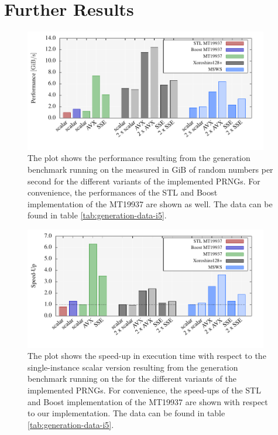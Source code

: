 \documentclass{stdlocal}
\begin{document}
\section{Further Results} %
\label{sec:further_results}
  \begin{figure}[H]
    \center
    \includegraphics[width=0.95\textwidth]{plots/generation_laptop.pdf}
    \caption[Generation Benchmark Performance for ]{%
      The plot shows the performance resulting from the generation benchmark running on the  measured in $\mathrm{GiB}$ of random numbers per second for the different variants of the implemented PRNGs.
      For convenience, the performances of the STL and Boost implementation of the MT19937 are shown as well.
      The data can be found in table \ref{tab:generation-data-i5}.
    }
    \label{fig:generation-performance-i5}
  \end{figure}

  \begin{figure}[H]
    \center
    \includegraphics[width=0.95\textwidth]{plots/generation_laptop_speedup.pdf}
    \caption[Generation Benchmark Speed-Up for ]{%
      The plot shows the speed-up in execution time with respect to the single-instance scalar version resulting from the generation benchmark running on the  for the different variants of the implemented PRNGs.
      For convenience, the speed-ups of the STL and Boost implementation of the MT19937 are shown with respect to our implementation.
      The data can be found in table \ref{tab:generation-data-i5}.
    }
    \label{fig:generation-speedup-i5}
  \end{figure}
\end{document}
